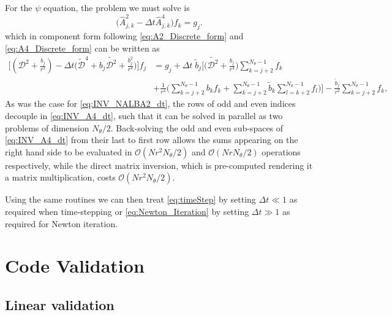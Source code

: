 \documentclass[a4paper]{article}
\begin{document}
For the $\psi$ equation, the problem we must solve is
\begin{equation}
\big( \hat{A}^2_{j,k} - \Delta t \hat{A}^4_{j,k} \big) f_k = g_j.
\end{equation}
which in component form following \eqref{eq:A2_Discrete_form} and \eqref{eq:A4_Discrete_form} can be written as
\begin{equation}
\begin{aligned}
\bigg[ (\mathcal{D}^2 + \frac{b_j}{r^2}) - \Delta t \bigg( \tilde{\mathcal{D}}^4 + b_j \tilde{ \mathcal{D}^2 } + \frac{b^2_j}{r^4} \bigg) \bigg] f_j  &=  g_j + \Delta t \; \tilde{b}_j \bigg[ \big( \tilde{\mathcal{D}^2} + \frac{b_j}{r^4} \big) \sum_{k = j + 2}^{N_{\theta} -1} f_k \\
 & + \frac{1}{r^4} \bigg( \sum_{k = j + 2}^{N_{\theta} -1} b_k f_k + \sum_{k = j + 2}^{N_{\theta} -1} \tilde{b}_k \sum_{l = k + 2}^{N_{\theta} -1} f_{l} \bigg) \bigg] - \frac{\tilde{b}_j}{r^2} \sum_{k = j + 2}^{N_{\theta} -1} f_k,
\end{aligned}
\label{eq:INV_A4_dt}
\end{equation}
As was the case for \eqref{eq:INV_NALBA2_dt}, the rows of odd and even indices decouple in \eqref{eq:INV_A4_dt}, such that it can be solved in parallel as two problems of dimension $N_{\theta}/2$. Back-solving the odd and even sub-spaces of \eqref{eq:INV_A4_dt} from their last to first row allows the sums appearing on the right hand side to be evaluated in $\mathcal{O}(Nr^2 N_{\theta}/2)$ and $\mathcal{O}(Nr N_{\theta}/2)$ operations respectively, while the direct matrix inversion, which is pre-computed rendering it a matrix multiplication, costs $\mathcal{O}(Nr^2 N_{\theta}/2)$.

Using the same routines we can then treat \eqref{eq:timeStep} by setting $\Delta t \ll 1$ as required when time-stepping or \eqref{eq:Newton_Iteration} by setting $\Delta t \gg 1$ as required for Newton iteration.


\section{Code Validation}

\subsection{Linear validation}
\end{document}

